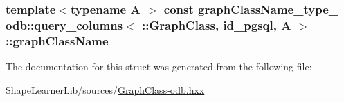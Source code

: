 \subsubsection[{graph\+Class\+Name}]{\setlength{\rightskip}{0pt plus 5cm}template$<$typename A $>$ const {\bf graph\+Class\+Name\+\_\+type\+\_\+} odb\+::query\+\_\+columns$<$ \+::{\bf Graph\+Class}, id\+\_\+pgsql, A $>$\+::graph\+Class\+Name\hspace{0.3cm}{\ttfamily [static]}}\label{structodb_1_1query__columns_3_01_1_1_graph_class_00_01id__pgsql_00_01_a_01_4_a185b90e23ae4f414ec83e51c13ebc0fc}


The documentation for this struct was generated from the following file\+:\begin{DoxyCompactItemize}
\item 
Shape\+Learner\+Lib/sources/\hyperlink{_graph_class-odb_8hxx}{Graph\+Class-\/odb.\+hxx}\end{DoxyCompactItemize}
